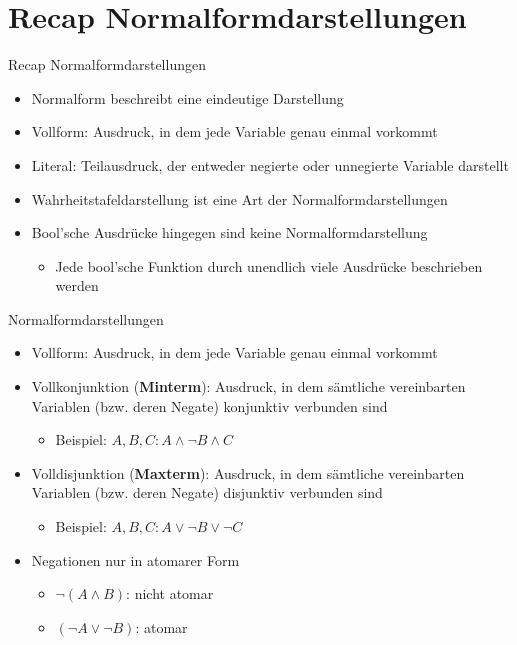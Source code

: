 \documentclass[12pt%
,xcolor=table
,aspectratio=169%
]{beamer}
\begin{document}
\section{Recap Normalformdarstellungen}
\begin{frame}{Recap Normalformdarstellungen}
\begin{itemize}
	\item Normalform beschreibt eine eindeutige Darstellung
	\item Vollform: Ausdruck, in dem jede Variable genau einmal vorkommt 
	\item Literal: Teilausdruck, der entweder negierte oder unnegierte Variable darstellt
	\item Wahrheitstafeldarstellung ist eine Art der Normalformdarstellungen
	\item Bool'sche Ausdrücke hingegen sind keine Normalformdarstellung
	\begin{itemize}
		\item Jede bool'sche Funktion durch unendlich viele Ausdrücke beschrieben werden
	\end{itemize}
\end{itemize}
\end{frame}

\begin{frame}{Normalformdarstellungen}
\begin{itemize}
	\item Vollform: Ausdruck, in dem jede Variable genau einmal vorkommt 
	\item Vollkonjunktion (\textbf{Minterm}): Ausdruck, in dem sämtliche vereinbarten Variablen (bzw. deren Negate) konjunktiv verbunden sind 
	\begin{itemize}
		\item Beispiel: $A,B,C: A \land \neg B \land C$
	\end{itemize}
	\item Volldisjunktion (\textbf{Maxterm}): Ausdruck, in dem sämtliche vereinbarten Variablen (bzw. deren Negate) disjunktiv verbunden sind
	\begin{itemize}
		\item Beispiel: $A,B,C: A \lor \neg B \lor \neg C$
	\end{itemize}
	\item Negationen nur in atomarer Form
	\begin{itemize}
		\item $\neg(A \land B)$: nicht atomar  
		\item $(\neg A \lor \neg B)$: atomar
	\end{itemize}
\end{itemize}
\end{frame}
\end{document}
